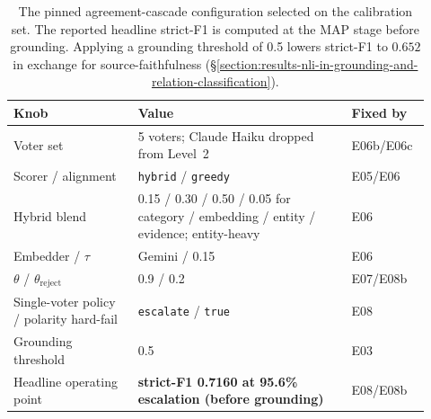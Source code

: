 \begin{table}[htpb]
\caption[Pinned agreement-cascade configuration]{The pinned agreement-cascade configuration selected on the calibration set. The reported headline strict-F1 is computed at the MAP stage before grounding. Applying a grounding threshold of 0.5 lowers strict-F1 to $0.652$ in exchange for source-faithfulness (§\ref{section:results-nli-in-grounding-and-relation-classification}).}
\label{tab:abc-configuration-of-record}
\centering
\begin{tabular}{p{0.28\linewidth} p{0.48\linewidth} p{0.16\linewidth}}
    \toprule
    \textbf{Knob} & \textbf{Value} & \textbf{Fixed by} \\
    \midrule
    Voter set
    & 5 voters; Claude Haiku dropped from Level~2
    & E06b/E06c \\
    Scorer / alignment
    & \texttt{hybrid} / \texttt{greedy}
    & E05/E06 \\
    Hybrid blend
    & 0.15 / 0.30 / 0.50 / 0.05 for category / embedding / entity / evidence; entity-heavy
    & E06 \\
    Embedder / $\tau$
    & Gemini / 0.15
    & E06 \\
    $\theta$ / $\theta_{\mathrm{reject}}$
    & 0.9 / 0.2
    & E07/E08b \\
    Single-voter policy / polarity hard-fail
    & \texttt{escalate} / \texttt{true}
    & E08 \\
    Grounding threshold
    & 0.5
    & E03 \\
    Headline operating point
    & \textbf{strict-F1 0.7160 at 95.6\% escalation (before grounding)}
    & E08/E08b \\
    \bottomrule
\end{tabular}
\end{table}